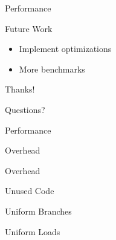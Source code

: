 \documentclass[xcolor={usenames,dvipsnames}, aspectratio=169, 12pt]{beamer}
\begin{document}
{\framelogo{\centering}
\begin{frame}{Performance}

\end{frame}}

\begin{frame}{Future Work}
\begin{itemize}
	\item Implement optimizations
	\item More benchmarks
\end{itemize}
\end{frame}

\begin{tumplainframe}{Thanks!}
\begin{center}
	\Huge Questions?
\end{center}
\end{tumplainframe}

\begin{frame}{Performance}
\end{frame}

\begin{frame}{Overhead}

\end{frame}

\begin{frame}{Overhead}
\end{frame}

\begin{frame}{Unused Code}
	
\end{frame}

\begin{frame}{Uniform Branches}

\end{frame}

\begin{frame}{Uniform Loads}

\end{frame}
\end{document}
